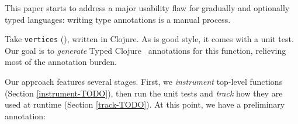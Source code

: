 % 





This paper starts to address a major usability flaw
for gradually and optionally typed languages:
writing type annotations is a manual process.

Take \texttt{vertices} (),
written in Clojure.
As is good style, it comes with a unit test.
Our goal is to \textit{generate} Typed Clojure~\cite{bonnaire2016practical}
annotations
for this function, relieving most of the annotation
burden.



Our approach features several stages.
First, we \textit{instrument} top-level functions
(Section \ref{instrument-TODO}),
then run the unit tests and \textit{track}
how they are used at runtime
(Section \ref{track-TODO}).
At this point, we have a preliminary
annotation:

